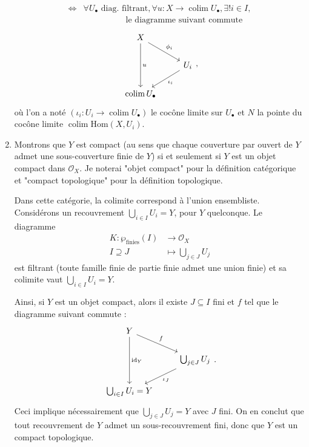 \documentclass{../../td}
\newcommand\id{\ensuremath{\operatorname{id}}}
\newcommand\colim{\ensuremath{\operatorname{colim}}}
\begin{document}
\begin{enumerate}
\begin{align*}
        \iff & \forall U_\bullet \text{ diag. filtrant}, \forall u : X \to \colim U_\bullet, \exists ! i \in I,\\
             & \quad\quad\quad\quad\quad \text{le diagramme suivant commute}
      \end{align*}
      \[
        \begin{tikzcd}
          X \arrow{dd}{u} \arrow{dr}{\phi_i} \\
          & U_i \arrow{dl}{\iota_i}\\
          \colim U_\bullet
        \end{tikzcd}
      ,\]
      où l'on a noté $(\iota_i : U_i \to \colim U_\bullet)$ le cocône limite sur $U_\bullet$ et $N$ la pointe du cocône limite $\colim \mathrm{Hom}(X, U_i)$.

    \item Montrons que $Y$ est compact (au sens que chaque couverture par ouvert de $Y$ admet une sous-couverture finie de $Y$) si et seulement si $Y$ est un objet compact dans $\mathcal{O}_X$.
      Je noterai "objet compact" pour la définition catégorique et "compact topologique" pour la définition topologique.

      Dans cette catégorie, la colimite correspond à l'union ensembliste.
      Considérons un recouvrement $\bigcup_{i \in  I} U_i = Y$, pour $Y$ quelconque.
      Le diagramme \begin{align*}
        K: \wp_\text{finies}(I) &\longrightarrow \mathcal{O}_X \\
        I\supseteq J &\longmapsto \bigcup_{j \in J} U_j
      \end{align*} est filtrant (toute famille finie de partie finie admet une union finie) et sa colimite vaut $\bigcup_{i \in  I} U_i = Y$.

      Ainsi, si $Y$ est un objet compact, alors il existe $J \subseteq I$ fini et $f$ tel que le diagramme suivant commute :
      \[
      \begin{tikzcd}
        Y \arrow{dr}{f} \arrow{dd}{\id_Y}\\
        & \bigcup_{j \in J} U_j \arrow{dl}{\iota_J}\\
        \bigcup_{i \in  I} U_i = Y
      \end{tikzcd}
      .\]
      Ceci implique nécessairement que $\bigcup_{j \in J} U_j = Y$ avec $J$ fini.
      On en conclut que tout recouvrement de $Y$ admet un sous-recouvrement fini, donc que $Y$ est un compact topologique.


\end{enumerate}
\end{document}
